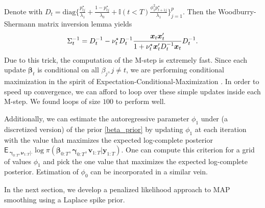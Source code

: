 \documentclass[ba]{imsart}
\numberwithin{equation}{section}
\theoremstyle{plain}
\def\x{\mbox{\boldmath$x$}}
\def\y{\mbox{\boldmath$y$}}
\def\b{\mbox{\boldmath$b$}}
\newcommand{\bm}[1]{\boldsymbol{#1}}
\newcommand{\E}{\mathsf{E\,}}
\def\y{\bm{y}}
\def\bg{\bm{\gamma}}
\def\b{\bm{\beta}}
\begin{document}
{{{Denote with $D_t=\mathrm{diag}\{\frac{p_{tj}^\star}{\lambda_1}+\frac{1-p_{tj}^\star}{\lambda_0}+\mathbb{I}({t<T})\frac{\phi_1^2 p^\star_{t+1j}}{\lambda_1} \}_{j=1}^p$. Then the Woodburry-Shermann matrix inversion lemma yields
$$
\Sigma_t^{-1}=D_t^{-1}-\nu_t^\star D_t^{-1}\frac{\x_t\x_t'}{1+\nu_t^\star \x_t'D_t^{-1}\x_t}D_t^{-1}.
$$
Due to this trick, the computation of the M-step is extremely fast.  Since each update $\b_t$ is conditional on all $\beta_j,j\neq t$, we are performing conditional maximization in the spirit of Expectation-Conditional-Maximization \cite{meng_ECM}.
In order to speed up convergence, we can afford to loop over these simple updates inside each M-step. We found loops of size $100$ to perform well.

Additionally, we can estimate the autoregressive parameter $\phi_1$ under (a discretized version) of the prior \eqref{beta_prior} by updating $\phi_1$ at each iteration with the value that maximizes 
the expected log-complete posterior
$\E_{\bg_{0:T},\bm \nu_{1:T}|\cdot}\log\pi(\b_{0:T},\bg_{0:T},\bm v_{1:T}|\y_{1:T})$. One can compute this criterion for a grid of values $\phi_1$ and pick the one value that maximizes the expected log-complete posterior. Estimation of $\phi_0$ can be incorporated in a similar vein.

In the next section, we develop a penalized likelihood approach to MAP smoothing using a Laplace spike prior.
}

}}
\end{document}
